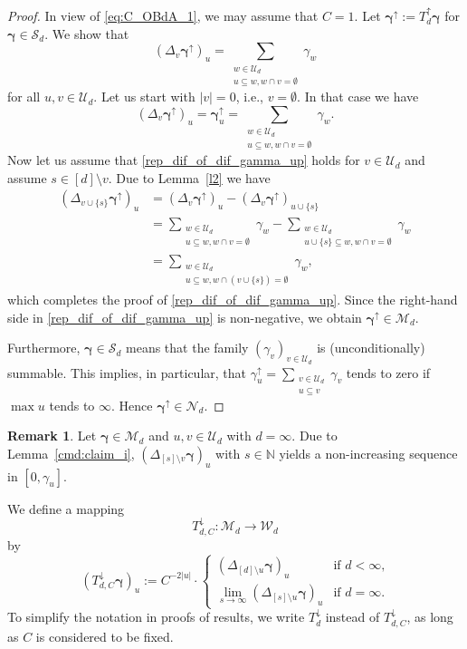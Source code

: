 \documentclass{article}
\newcommand{\N}  {{\mathbb N}}
\newcommand{\bg}{{\boldsymbol{\gamma}}}
\newcommand{\U}  {\mathcal{U}}
\newcommand{\W}  {\mathcal{W}}
\newcommand{\M}  {\mathcal{M}}
\newcommand{\mN}  {\mathcal{N}}
\newcommand{\SSS}{\mathcal{S}}
\newcommand{\lo}{\downarrow}
\newcommand{\up}{\uparrow}
\theoremstyle{plain}
\theoremstyle{definition}
\newtheorem{rem}{Remark}
\begin{document}
\begin{proof}
In view of \eqref{eq:C_OBdA_1}, we may assume that $C=1$. 
Let $\bg^\up := T^\up_d \bg$ for $\bg \in \SSS_d$. We show that
\begin{equation}\label{rep_dif_of_dif_gamma_up}
\left(\Delta_v \bg^\up \right)_u = 
\sum_{\substack{w\in \U_d \\ u\subseteq w, w\cap v = \emptyset}}
\gamma_w
\end{equation}
for all $u, v \in \U_d$.
Let us start with $|v|=0$, i.e., 
$v=\emptyset$. In that case we have
\[
\left(\Delta_v \bg^\up\right)_u = \bg^\up_u = 
\sum_{\substack{w\in \U_d \\ u\subseteq w, w\cap v = \emptyset}}
\gamma_w.
\]
Now let us assume that \eqref{rep_dif_of_dif_gamma_up} 
holds for $v\in \U_d$ and assume $s \in [d]\setminus v$. 
Due to Lemma~\ref{l2} we have
\begin{align*}
\left(\Delta_{v \cup \{s\}} \bg^\up\right)_u 
&=
\left(\Delta_{v} \bg^\up\right)_u -
\left(\Delta_{v} \bg^\up\right)_{u \cup \{s\}} \\
&= 
\sum_{\substack{w\in \U_d \\ u\subseteq w, w\cap v = \emptyset}}
\gamma_w
- \sum_{\substack{w\in \U_d \\ u\cup \{s\} \subseteq w, 
        w\cap v = \emptyset}}
\gamma_w \\
&= \sum_{\substack{w\in \U_d \\ u\subseteq w, 
         w\cap (v\cup \{s\}) = \emptyset}}
\gamma_w,
\end{align*}
which completes the proof of \eqref{rep_dif_of_dif_gamma_up}.
Since the right-hand side in \eqref{rep_dif_of_dif_gamma_up} is
non-negative, we obtain $\bg^\up \in \M_d$.

Furthermore, $\bg \in \SSS_d$ means that the family 
$(\gamma_v)_{v\in \U_d}$ is (unconditionally) summable. 
This implies, in particular, that 
$\gamma_u^{\up} = \sum_{\substack{v\in \U_d \\ u\subseteq v}}
\gamma_v$ tends to zero if 
$\max u$ tends to $\infty$. Hence $\bg^{\up} \in \mN_d$.
\end{proof}

\begin{rem}\label{r1}
Let $\bg \in \M_d$ and $u,v \in \U_d$ with $d=\infty$.
Due to Lemma~\ref{cmd:claim_i},
$\left(\Delta_{[s] \setminus v} \bg\right)_u$ 
with $s \in \N$ yields a non-increasing sequence in $[0,\gamma_u]$.
\end{rem}

We define a mapping 
\[
T^\lo_{d,C} \colon \M_d \to \W_d
\]
by
\[
\left(T^\lo_{d,C} \bg\right)_u :=
C^{-2|u|} \cdot
\begin{cases}
\left(\Delta_{[d] \setminus u} \bg\right)_u & \text{if $d < \infty$,}\\
\lim_{s \to \infty} \left(\Delta_{[s] \setminus u} \bg\right)_u & 
\text{if $d = \infty$.}
\end{cases}
\]
To simplify the notation in proofs of results,
we write $T^\lo_d$ instead of $T^\lo_{d,C}$, as long as
$C$ is considered to be fixed.
\end{document}
